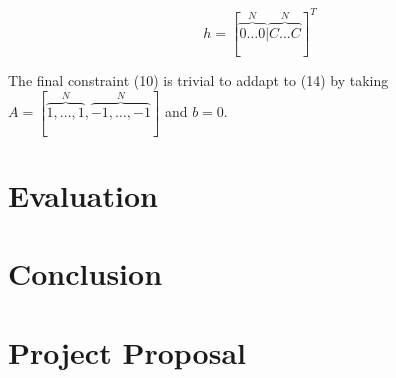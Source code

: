 \documentclass[12pt,twoside,notitlepage]{report}
\begin{document}
\[h = [\overbrace{0 \dots 0}^N|\overbrace{C \dots C}^N]^T\]

The final constraint (10) is trivial to addapt to (14) by taking 
\( A=[\overbrace{1,\dots,1}^N,\overbrace{-1,\dots,-1}^N]\) and \(b=0\).

\cleardoublepage
\chapter{Evaluation}

\cleardoublepage
\chapter{Conclusion}
\cleardoublepage



\cleardoublepage

\appendix

\chapter{Project Proposal}

%
\end{document}
